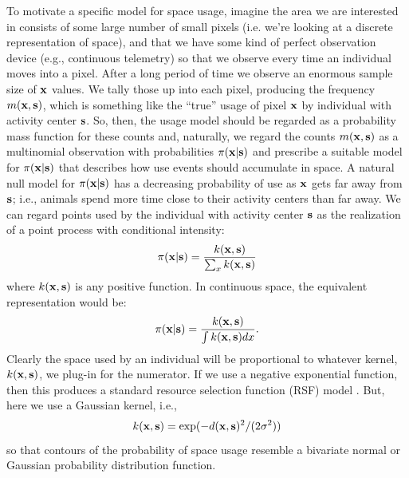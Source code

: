 To motivate a specific model for space usage, imagine
the area we are interested in consists of some large
number of small pixels (i.e. we're looking at a discrete
representation of space), and that we have some kind of
perfect observation device (e.g., continuous telemetry) so that we
observe every time an individual moves into a pixel. After a long
period of time we observe an enormous sample size of ${\bf x}$
values. We tally those up into each pixel, producing the frequency
$m({\bf x},{\bf s})$, which is something like the ``true'' usage of
pixel ${\bf x}$ by individual with activity center
${\bf s}$.  So, then, the usage model
should be regarded as a probability mass function for these counts
and, naturally, we regard the counts $m({\bf x},{\bf s})$ as a
multinomial observation with probabilities $\pi({\bf x}|{\bf s})$ and
prescribe a suitable model for $\pi({\bf x}|{\bf s})$ that describes
how use events should accumulate in space. A natural null model for
$\pi({\bf x}|{\bf s})$ has a decreasing probability of use as ${\bf
  x}$ gets far away from ${\bf s}$; i.e., animals spend more time
close to their activity centers than far away.  We can regard points
used by the individual with activity center ${\bf s}$ as the
realization of a point process with conditional intensity:
\begin{equation}
\pi({\bf x}|{\bf s}) =  \frac{ k({\bf x},{\bf s}) }{ \sum_{x} k({\bf
    x},{\bf s}) }
\label{scr0.eq.ud}
\end{equation}
where $k({\bf x},{\bf s})$ is any positive function.
In continuous space, the equivalent representation would be:
\[
\pi({\bf x}|{\bf s}) =  \frac{ k({\bf x},{\bf s}) }{ \int k({\bf
    x},{\bf s}) dx }.
\]
Clearly the space used by an individual will be proportional
to whatever kernel, $k({\bf x},{\bf s})$, we plug-in for the numerator.
If we use a negative exponential function, then this produces a
standard
resource selection function (RSF) model
\citep[e.g.,][Ch. 8]{manly_etal:2002}.
But, here we use a Gaussian kernel, i.e.,
\[
 k({\bf x},{\bf s})= \exp(  -d({\bf x},{\bf s})^{2}/(2\sigma^{2}))
\]
so that contours of the probability of space usage resemble a
bivariate normal or Gaussian probability distribution function.

